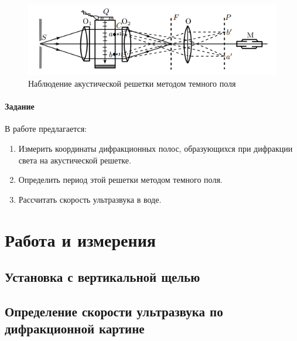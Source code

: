 \documentclass[a4paper, 12pt]{article}
\begin{document}
\begin {figure}[H]
	\begin{center}
		\includegraphics[width = 0.6 \textwidth]{ghmDF_croper_ru.png}
		\caption{Наблюдение акустической решетки методом темного поля}
	\end{center}
\end {figure}

\paragraph{Задание}
В работе предлагается: 
\begin {enumerate}
\item Измерить координаты дифракционных полос, образующихся при дифракции света на акустической решетке.
\item Определить период этой решетки методом темного поля.
\item Рассчитать скорость ультразвука в воде.
\end {enumerate}

\newpage


\section{Работа и измерения}

\subsection*{Установка с вертикальной щелью}
\subsection*{Определение скорости ультразвука по дифракционной картине}
\end{document}
